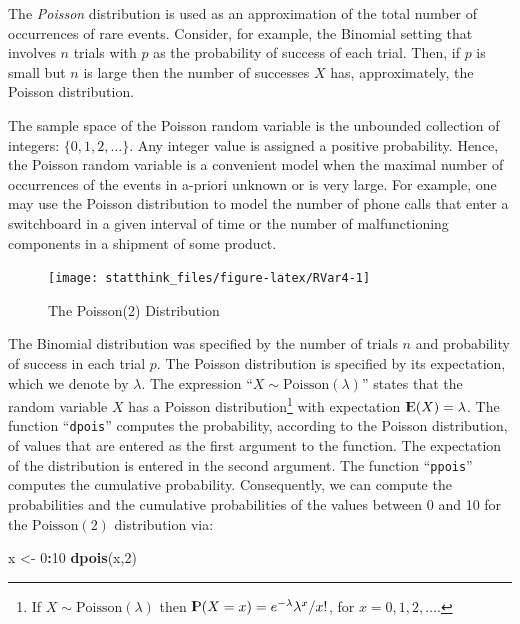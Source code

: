 \documentclass[]{krantz}
\makeatletter
\newenvironment{Shaded}{\begin{snugshade}}{\end{snugshade}}
\newcommand{\KeywordTok}[1]{\textcolor[rgb]{0.13,0.29,0.53}{\textbf{#1}}}
\newcommand{\DecValTok}[1]{\textcolor[rgb]{0.00,0.00,0.81}{#1}}
\newcommand{\StringTok}[1]{\textcolor[rgb]{0.31,0.60,0.02}{#1}}
\newcommand{\OperatorTok}[1]{\textcolor[rgb]{0.81,0.36,0.00}{\textbf{#1}}}
\newcommand{\NormalTok}[1]{#1}
\newcommand{\Expec}{{\rm I\kern-.3em E}}
\newcommand{\Prob}{{\rm I\kern-.3em P}}
\newenvironment{kframe}{%
\medskip{}
\setlength{\fboxsep}{.8em}
 \def\at@end@of@kframe{}%
 \ifinner\ifhmode%
  \def\at@end@of@kframe{\end{minipage}}%
  \begin{minipage}{\columnwidth}%
 \fi\fi%
 \def\FrameCommand##1{\hskip\@totalleftmargin \hskip-\fboxsep
 \colorbox{shadecolor}{##1}\hskip-\fboxsep
     \hskip-\linewidth \hskip-\@totalleftmargin \hskip\columnwidth}%
 \MakeFramed {\advance\hsize-\width
   \@totalleftmargin\z@ \linewidth\hsize
   \@setminipage}}%
 {\par\unskip\endMakeFramed%
 \at@end@of@kframe}
\renewenvironment{Shaded}{\begin{kframe}}{\end{kframe}}
\theoremstyle{definition}
\theoremstyle{definition}
\theoremstyle{definition}
\theoremstyle{remark}
\makeatother
\begin{document}
The \emph{Poisson} distribution is used as an approximation of the total
number of occurrences of rare events. Consider, for example, the
Binomial setting that involves \(n\) trials with \(p\) as the
probability of success of each trial. Then, if \(p\) is small but \(n\)
is large then the number of successes \(X\) has, approximately, the
Poisson distribution.

The sample space of the Poisson random variable is the unbounded
collection of integers: \(\{0,1,2, \ldots\}\). Any integer value is
assigned a positive probability. Hence, the Poisson random variable is a
convenient model when the maximal number of occurrences of the events in
a-priori unknown or is very large. For example, one may use the Poisson
distribution to model the number of phone calls that enter a switchboard
in a given interval of time or the number of malfunctioning components
in a shipment of some product.

\begin{figure}

{\centering \texttt{[image: statthink\_files/figure-latex/RVar4-1]} 

}

\caption{The Poisson(2) Distribution}\label{fig:RVar4}
\end{figure}

The Binomial distribution was specified by the number of trials \(n\)
and probability of success in each trial \(p\). The Poisson distribution
is specified by its expectation, which we denote by \(\lambda\). The
expression ``\(X \sim \mathrm{Poisson}(\lambda)\)'' states that the
random variable \(X\) has a Poisson distribution\footnote{If
  \(X \sim \mathrm{Poisson}(\lambda)\) then
  \(\Prob(X=x) = e^{-\lambda}\lambda^x/x!\), for \(x=0,1,2,\ldots\).}
with expectation \(\Expec(X) = \lambda\). The function
``\texttt{dpois}'' computes the probability, according to the Poisson
distribution, of values that are entered as the first argument to the
function. The expectation of the distribution is entered in the second
argument. The function ``\texttt{ppois}'' computes the cumulative
probability. Consequently, we can compute the probabilities and the
cumulative probabilities of the values between 0 and 10 for the
\(\mathrm{Poisson}(2)\) distribution via:

\begin{Shaded}
\begin{Highlighting}[]
\NormalTok{x <-}\StringTok{ }\DecValTok{0}\OperatorTok{:}\DecValTok{10}
\KeywordTok{dpois}\NormalTok{(x,}\DecValTok{2}\NormalTok{)}
\end{Highlighting}
\end{Shaded}
\end{document}
